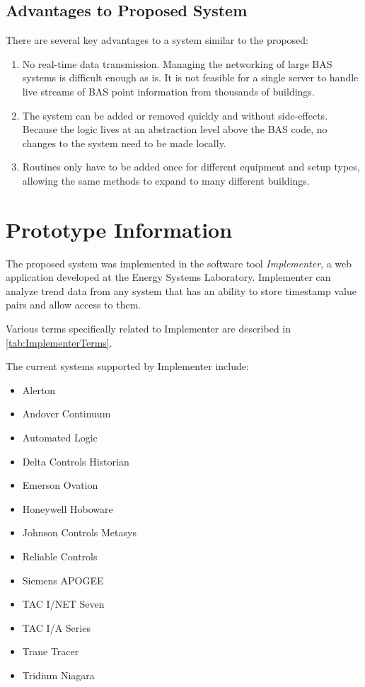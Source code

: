 \subsection{Advantages to Proposed System}

There are several key advantages to a system similar to the proposed:

\begin{enumerate}
    \item No real-time data transmission. Managing the networking of
        large BAS systems is difficult enough as is. It is not feasible
        for a single server to handle live streams of BAS point
        information from thousands of buildings. 

    \item The system can be added or removed quickly and without
        side-effects. Because the logic lives at an abstraction level
        above the BAS code, no changes to the system need to be made
        locally. 

    \item Routines only have to be added once for different equipment
        and setup types, allowing the same methods to expand to many
        different buildings. 
\end{enumerate}


\section{Prototype Information}

The proposed system was implemented in the software tool
\textit{Implementer}, a web application developed at the Energy Systems
Laboratory. Implementer can analyze trend data from any system that has
an ability to store timestamp value pairs and allow access to them. 

Various terms specifically related to Implementer are described in
\tableref{} \ref{tab:ImplementerTerms}.  

The current systems supported by Implementer include:

\begin{itemize}
    \item Alerton
    \item Andover Continuum
    \item Automated Logic
    \item Delta Controls Historian
    \item Emerson Ovation
    \item Honeywell Hoboware
    \item Johnson Controls Metasys
    \item Reliable Controls
    \item Siemens APOGEE
    \item TAC I/NET Seven
    \item TAC I/A Series
    \item Trane Tracer
    \item Tridium Niagara 
\end{itemize}

